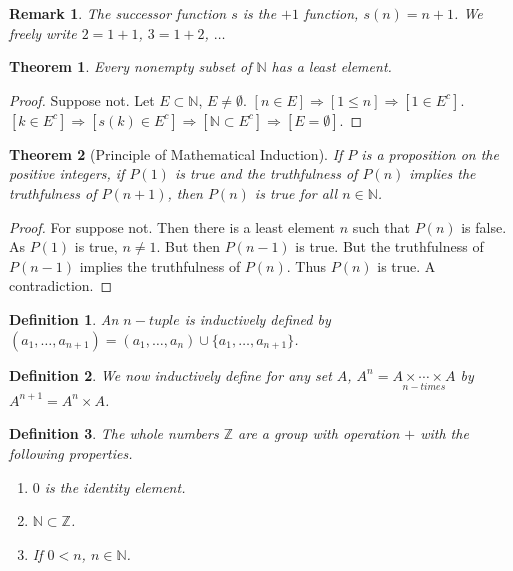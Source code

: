 \documentclass[oneside]{book}
\theoremstyle{mystyle}
\newtheorem{theorem}{Theorem}[section]
\newtheorem{definition}{Definition}[section]
\newtheorem{remark}{Remark}[section]
\begin{document}
\begin{remark}
The successor function $s$ is the $+1$ function, $s(n)=n+1$. We freely write $2=1+1$, $3=1+2$, $\hdots$
\end{remark}

\begin{theorem}
Every nonempty subset of $\mathbb{N}$ has a least element.
\end{theorem}
\begin{proof}
Suppose not. Let $E\subset \mathbb{N}$, $E\ne\emptyset$. $[n\in E]\Rightarrow [1\leq n]\Rightarrow [1\in E^c]$. $[k\in E^c]\Rightarrow [s(k)\in E^c]\Rightarrow [\mathbb{N} \subset E^c]\Rightarrow [E = \emptyset]$.
\end{proof}

\begin{theorem}[Principle of Mathematical Induction]
If $P$ is a proposition on the positive integers, if $P(1)$ is true and the truthfulness of $P(n)$ implies the truthfulness of $P(n+1)$, then $P(n)$ is true for all $n\in \mathbb{N}$.
\end{theorem}
\begin{proof}
For suppose not. Then there is a least element $n$ such that $P(n)$ is false. As $P(1)$ is true, $n\ne 1$. But then $P(n-1)$ is true. But the truthfulness of $P(n-1)$ implies the truthfulness of $P(n)$. Thus $P(n)$ is true. A contradiction.
\end{proof}

\begin{definition}
An $n-tuple$ is inductively defined by $(a_1,\hdots,a_{n+1}) = (a_1,\hdots, a_n)\cup \{a_1,\hdots,a_{n+1}\}$.
\end{definition}

\begin{definition}
We now inductively define for any set $A$, $A^{n} = \underset{n-times}{A\times \cdots \times A}$ by $A^{n+1} = A^n \times A$.
\end{definition}

\begin{definition}
The whole numbers $\mathbb{Z}$ are a group with operation $+$ with the following properties.
\begin{enumerate}
\item $0$ is the identity element.
\item $\mathbb{N}\subset \mathbb{Z}$.
\item If $0<n$, $n\in \mathbb{N}$.
\end{enumerate}
\end{definition}
\end{document}

